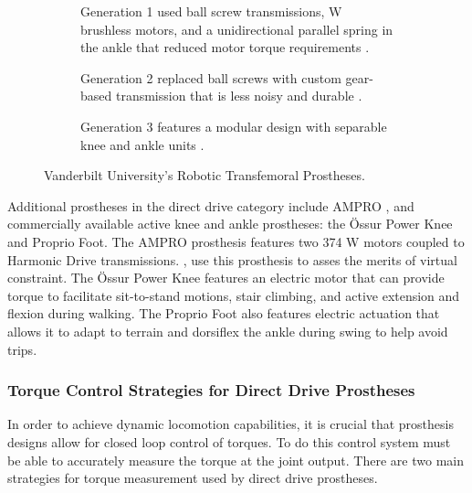 \begin{figure*}[t]
    \centering
	\begin{subfigure}[t]{0.3\textwidth}
    	\centering
        \caption{Generation 1 used ball screw transmissions, \unit[200]{W}
        brushless motors, and a unidirectional parallel spring in the ankle that
        reduced motor torque requirements \citep{sup2009preliminary}.}
        \label{fig:vanderbilt_gen_1}
	\end{subfigure}
	\begin{subfigure}[t]{0.3\textwidth}
    	\centering
        \caption{Generation 2 replaced ball screws with custom gear-based
        transmission that is less noisy and durable \citep{lawson2013control}.}
	\end{subfigure}
	\begin{subfigure}[t]{0.3\textwidth}
    	\centering
        \caption{Generation 3 features a modular design with separable knee and
        ankle units \citep{lawson2014robotic}.}
	\end{subfigure}
    \caption{Vanderbilt University's Robotic Transfemoral Prostheses.}
    \label{fig:vanderbilt_prostheses}
\end{figure*}

Additional prostheses in the direct drive category include AMPRO
\citep{zhao2016first}, and commercially available active knee and ankle
prostheses: the Össur Power Knee and Proprio Foot. The AMPRO prosthesis features
two 374 W motors coupled to Harmonic Drive transmissions.
\citet{zhao2016first}, use this prosthesis to asses the merits of virtual
constraint. The Össur Power Knee features an electric motor that can provide
torque to facilitate sit-to-stand motions, stair climbing, and active extension
and flexion during walking. The Proprio Foot also features electric actuation
that allows it to adapt to terrain and dorsiflex the ankle during swing to help
avoid trips. 

\subsubsection{Torque Control Strategies for Direct Drive
Prostheses}In order to achieve dynamic locomotion capabilities, it is crucial that
prosthesis designs allow for closed loop control of torques. To do this control
system must be able to accurately measure the torque at the joint output. There
are two main strategies for torque measurement used by direct drive prostheses.

